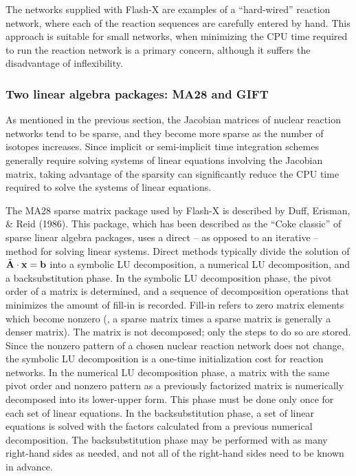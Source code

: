 
The networks supplied with Flash-X are examples of a ``hard-wired'' reaction
network, where each of the reaction sequences are carefully entered
by hand.  This approach is suitable for small networks, when minimizing
the CPU time required to run the reaction network is a primary
concern, although it suffers the disadvantage of inflexibility.



\subsubsection{Two linear algebra packages:  MA28 and GIFT}

As mentioned in the previous section, the Jacobian matrices of
nuclear reaction networks tend to be sparse, and they become more
sparse as the number of isotopes increases.  Since implicit or
semi-implicit time integration schemes generally require solving
systems of linear equations involving the Jacobian matrix, taking
advantage of the sparsity can significantly reduce the CPU time
required to solve the systems of linear equations.

The MA28 sparse matrix package used by Flash-X is described by Duff,
Erisman, \& Reid (1986).  This package, which has been described
as the ``Coke classic'' of sparse linear algebra packages, uses a direct
-- as opposed to an iterative -- method for solving linear systems.  Direct
methods typically divide the solution of $\tilde{{\bf A}} \cdot {\bf
x} = {\bf b}$ into a symbolic LU decomposition, a numerical LU
decomposition, and a backsubstitution phase.  In the symbolic LU
decomposition phase, the pivot order of a matrix is determined, and a
sequence of decomposition operations that minimizes the amount of
fill-in is recorded. Fill-in refers to zero matrix elements which
become nonzero (\eg, a sparse matrix times a sparse matrix is
generally a denser matrix).  The matrix is not decomposed; only the
steps to do so are stored. Since the nonzero pattern of a chosen
nuclear reaction network does not change, the symbolic LU
decomposition is a one-time initialization cost for reaction networks.
In the numerical LU decomposition phase, a matrix with the same pivot
order and nonzero pattern as a previously factorized matrix is
numerically decomposed into its lower-upper form.  This phase must be
done only once for each set of linear equations.  In the
backsubstitution phase, a set of linear equations is solved with the
factors calculated from a previous numerical decomposition.  The
backsubstitution phase may be performed with as many right-hand sides
as needed, and not all of the right-hand sides need to be known in
advance.

